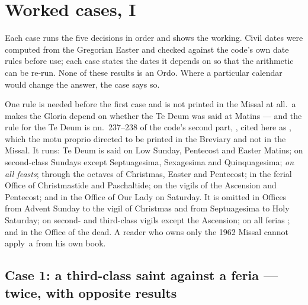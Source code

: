\section{Worked cases, I}

Each case runs the five decisions in order and shows the working. Civil dates
were computed from the Gregorian Easter and checked against the code's own
date rules before use; each case states the dates it depends on so that the
arithmetic can be re-run. None of these results is an Ordo. Where a particular
calendar would change the answer, the case says so.

One rule is needed before the first case and is not printed in the Missal at
all. \,a makes the Gloria depend on whether the Te Deum was said at
Matins --- and the rule for the Te Deum is nn.~237--238 of the code's second
part, , cited here as , which
the motu proprio directed to be printed in the Breviary and not in the Missal.
It runs: Te Deum is said on Low Sunday,
Pentecost and Easter Matins; on second-class Sundays except Septuagesima,
Sexagesima and Quinquagesima; \emph{on all feasts}; through the octaves of
Christmas, Easter and Pentecost; in the ferial Office of Christmastide and
Paschaltide; on the vigils of the Ascension and Pentecost; and in the Office
of Our Lady on Saturday. It is omitted in Offices  from
Advent Sunday to the vigil of Christmas and from Septuagesima to Holy
Saturday; on second- and third-class vigils except the Ascension; on all
ferias ; and in the Office of the dead. A reader who owns
only the 1962 Missal cannot apply \,a from his own book.

\subsection{Case 1: a third-class saint against a feria --- twice, with
opposite results}

